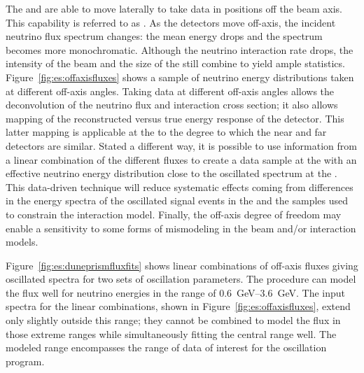 The  and  %
are able to move laterally to take data in positions off the beam axis.  This capability is referred to as . As the detectors move off-axis, the incident neutrino flux spectrum changes:    the mean energy drops and the spectrum becomes more monochromatic.  Although the neutrino interaction rate drops, the intensity of the beam and the size of the  still combine to yield ample statistics. %
Figure~\ref{fig:es:offaxisfluxes} shows a sample of neutrino energy distributions taken at different off-axis angles.
%
Taking data at different off-axis angles allows the deconvolution of the neutrino flux and interaction cross section; it also allows mapping of the reconstructed versus true energy response of the detector.  This latter mapping is applicable at the  to the degree to which the near and far  detectors are similar.  Stated a different way, it is possible to use information from a linear combination of the different fluxes to create a data sample at the  with an effective neutrino energy distribution close to the oscillated spectrum at the .  This data-driven technique will reduce systematic effects coming from differences in the energy spectra of the oscillated signal events in the  and the  samples used to constrain the interaction model. Finally, the off-axis degree of freedom may enable a sensitivity to some forms of mismodeling in the beam and/or interaction models. %

Figure~\ref{fig:es:duneprismfluxfits} shows linear combinations of off-axis fluxes giving  oscillated spectra for two sets of oscillation parameters. The procedure can model the  flux well for neutrino energies in the range of \SIrange{0.6}{3.6}{GeV}. 
The input spectra for the linear combinations, shown in Figure~\ref{fig:es:offaxisfluxes}, extend only slightly outside this range; they cannot be combined to model the flux in those extreme ranges while simultaneously fitting the central range well. 
The modeled range encompasses the range of data of interest for the oscillation program.   


